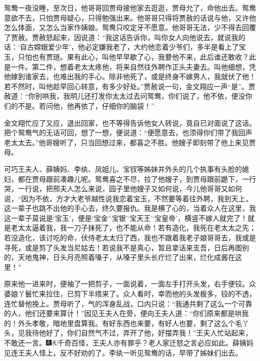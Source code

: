 鸳鸯一夜没睡，至次日，他哥哥回贾母接他家去逛逛，贾母允了，命他出去。鸳鸯意欲不去，只怕贾母疑心，只得勉强出来。他哥哥只得将贾赦的话说与他，又许他怎么体面，又怎么当家作姨娘。鸳鸯只咬定牙不愿意。他哥哥无法，少不得去回覆了贾赦。贾赦怒起来，因说道：``我这话告诉你，叫你女人向他说去，就说我的话：`自古嫦娥爱少年'，他必定嫌我老了，大约他恋着少爷们，多半是看上了宝玉，只怕也有贾琏。果有此心，叫他早早歇了心，我要他不来，此后谁还敢收？此是一件。第二件，想着老太太疼他，将来自然往外聘作正头夫妻去。叫他细想，凭他嫁到谁家去，也难出我的手心。除非他死了，或是终身不嫁男人，我就伏了他！若不然时，叫他趁早回心转意，有多少好处。''贾赦说一句，金文翔应一声``是''。贾赦道：``你别哄我，我明儿还打发你太太过去问鸳鸯，你们说了，他不依，便没你们的不是。若问他，他再依了，仔细你的脑袋！''

金文翔忙应了又应，退出回家，也不等得告诉他女人转说，竟自已对面说了这话。把个鸳鸯气的无话可回，想了一想，便说道：``便愿意去，也须得你们带了我回声老太太去。''他哥嫂听了，只当回想过来，都喜之不胜。他嫂子即刻带了他上来见贾母。

可巧王夫人、薛姨妈、李纨、凤姐儿、宝钗等姊妹并外头的几个执事有头脸的媳妇，都在贾母跟前凑趣儿呢。鸳鸯喜之不尽，拉了他嫂子，到贾母跟前跪下，一行哭，一行说，把邢夫人怎么来说，园子里他嫂子又如何说，今儿他哥哥又如何说，``因为不依，方才大老爷越性说我恋着宝玉，不然要等着往外聘，我到天上，这一辈子也跳不出他的手心去，终久要报仇。我是横了心的，当着众人在这里，我这一辈子莫说是`宝玉'，便是`宝金'`宝银'`宝天王'`宝皇帝'，横竖不嫁人就完了！就是老太太逼着我，我一刀子抹死了，也不能从命！若有造化，我死在老太太之先；若没造化，该讨吃的命，伏侍老太太归了西，我也不跟着我老子娘哥哥去，我或是寻死，或是剪了头发当尼姑去！若说我不是真心，暂且拿话来支吾，日后再图别的，天地鬼神，日头月亮照着嗓子，从嗓子里头长疔烂了出来，烂化成酱在这里！''

原来他一进来时，便袖了一把剪子，一面说着，一面左手打开头发，右手便铰。众婆娘丫鬟忙来拉住，已剪下半绺来了。众人看时，幸而他的头发极多，铰的不透，连忙替他挽上。贾母听了，气的浑身乱战，口内只说：``我通共剩了这么一个可靠的人，他们还要来算计！''因见王夫人在旁，便向王夫人道：``你们原来都是哄我的！外头孝敬，暗地里盘算我。有好东西也来要，有好人也要，剩了这么个毛丫头，见我待他好了，你们自然气不过，弄开了他，好摆弄我！''王夫人忙站起来，不敢还一言。{\includegraphics[width=3mm]{../Images/00004}\includegraphics[width=3mm]{../Images/00012}\footnotesize \kaishu 千奇百怪，王夫人亦有罪乎？老人家迁怒之言必应如此。}薛姨妈见连王夫人怪上，反不好劝的了。李纨一听见鸳鸯的话，早带了姊妹们出去。


